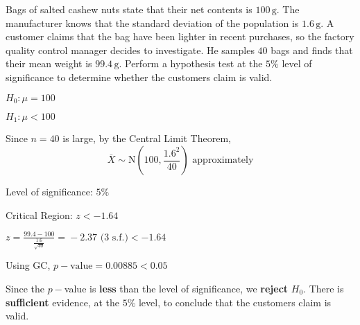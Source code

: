 \documentclass[11pt,a4paper]{book}
\begin{document}
\newpage

\begin{example}

Bags of salted cashew nuts state that their net contents is $100\,\text{g}$.
The manufacturer knows that the standard deviation of the population
is $1.6\,\text{g}$. A customer claims that the bag have been lighter
in recent purchases, so the factory quality control manager decides
to investigate. He samples $40$ bags and finds that their mean weight
is $99.4\,\text{g}$. Perform a hypothesis test at the $5\%$ level
of significance to determine whether the customers claim is valid.

\Solution

\begin{steps}[leftmargin=1.5cm]

\item  $H_{0}:\mu=100$

$H_{1}:\mu<100$

\item  Since $n=40$ is large, by the Central Limit Theorem, 
\[
\overline{X}\sim\text{N}\left(100,\frac{1.6^{2}}{40}\right)\text{ approximately}
\]

\item  Level of significance: $5\%$

Critical Region: $z<-1.64$

\item  ${\displaystyle z=\frac{99.4-100}{\frac{1.6}{\sqrt{40}}}=}-2.37\text{ (3 s.f.)}<-1.64$

\item  Using GC, $p-\text{value}=0.00885<0.05$

\item 

\begin{tcolorbox}[colback=white, colframe=black,boxrule=.4pt, sharpish corners,box align=center]

Since the $p-$value is \textbf{less} than the level of significance,
we \textbf{reject} $H_{0}$. There is \textbf{sufficient} evidence,
at the $5\%$ level, to conclude that the customers claim is valid.
\end{tcolorbox}

\end{steps}

\end{example}



\newpage
\end{document}
